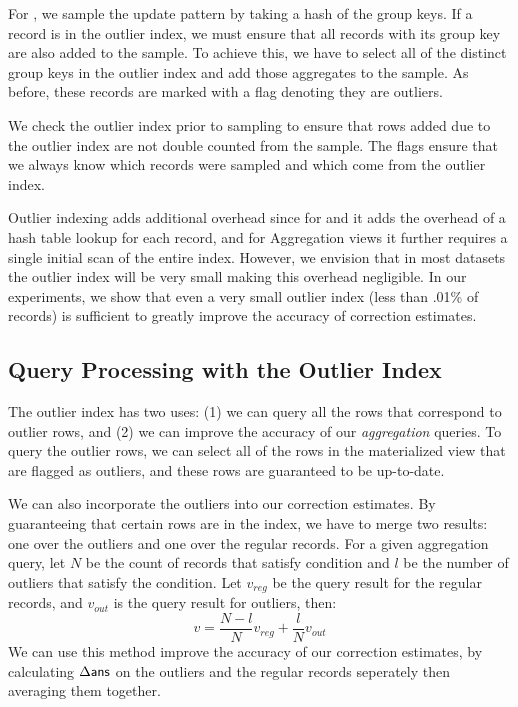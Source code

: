 For \aggview, we sample the update pattern by taking a hash of the group keys.
If a record is in the outlier index, we must ensure that all records with its group key are also added to the sample.
To achieve this, we have to select all of the distinct group keys in the outlier index and add those aggregates to the sample.
As before, these records are marked with a flag denoting they are outliers.

We check the outlier index prior to sampling to ensure that rows added due to the outlier index are not double counted from the sample.
The flags ensure that we always know which records were sampled and which come from the outlier index.

Outlier indexing adds additional overhead since for \spview and \fjview it adds the overhead of a hash table lookup for each record, and for Aggregation views it further requires a single initial scan of the entire index. 
However, we envision that in most datasets the outlier index will be very small making this overhead negligible.
In our experiments, we show that even a very small outlier index (less than .01\% of records) is sufficient to greatly improve the accuracy of
correction estimates.

\subsection{Query Processing with the Outlier Index} 
The outlier index has two uses: (1) we can query all the rows that correspond to outlier rows, 
and (2) we can improve the accuracy of our \emph{aggregation} queries.
To query the outlier rows, we can select all of the rows in the materialized view that are flagged as outliers, and these rows are guaranteed to be up-to-date.

We can also incorporate the outliers into our correction estimates.  
By guaranteeing that certain rows are in the index, we
have to merge two results: one over the outliers and one over the regular records.
For a given aggregation query, let $N$ be the count of records that satisfy condition and $l$ be the number of outliers that satisfy the condition.
Let $v_{reg}$ be the query result for the regular records, and $v_{out}$ is the query result for outliers, then:
\[
 v = \frac{N-l}{N}v_{reg} + \frac{l}{N}v_{out}
\]
We can use this method improve the accuracy of our correction estimates, by calculating $\Delta\textsf{ans}$ 
on the outliers and the regular records seperately then averaging them together. 
